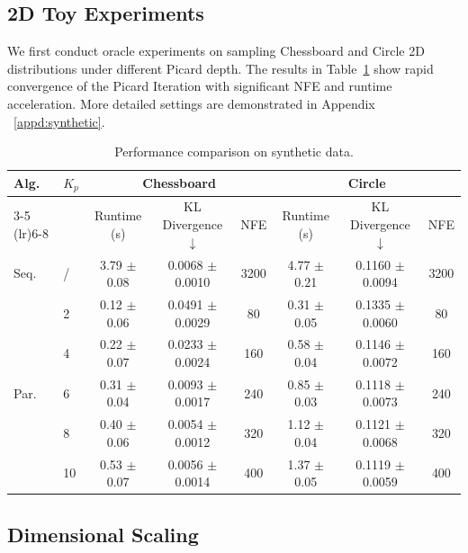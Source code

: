 \documentclass{article}
\begin{document}
\subsection{2D Toy Experiments}
We first conduct oracle experiments on sampling Chessboard and Circle 2D distributions under different Picard depth. The results in Table~\ref{tab:2Dtoy} show rapid convergence of the Picard Iteration with significant NFE and runtime acceleration. More detailed settings are demonstrated in Appendix ~\ref{appd:synthetic}.
\begin{table}[ht]
\centering
\captionsetup{skip=8pt}
\small
\caption{Performance comparison on synthetic data.}
\label{tab:2Dtoy}
\begin{tabular}{ll ccc ccc}
\toprule
\multirow{2}{*}{Alg.} & \multirow{2}{*}{$K_p$} & \multicolumn{3}{c}{\textbf{Chessboard}} & \multicolumn{3}{c}{\textbf{Circle}} \\
\cmidrule(lr){3-5} \cmidrule(lr){6-8}
& & Runtime (s) & KL Divergence$\downarrow$ & NFE & Runtime (s) & KL Divergence$\downarrow$ & NFE \\
\midrule
Seq. 
& / & 3.79 $\pm$ 0.08 & 0.0068 $\pm$ 0.0010 & 3200 & 4.77 $\pm$ 0.21 & 0.1160 $\pm$ 0.0094 & 3200 \\
\midrule
\multirow{6}{*}{Par.} 
& 2  & 0.12 $\pm$ 0.06 & 0.0491 $\pm$ 0.0029 & 80  & 0.31 $\pm$ 0.05 & 0.1335 $\pm$ 0.0060 & 80  \\
& 4  & 0.22 $\pm$ 0.07 & 0.0233 $\pm$ 0.0024 & 160  & 0.58 $\pm$ 0.04 & 0.1146 $\pm$ 0.0072 & 160  \\
& 6  & 0.31 $\pm$ 0.04 & 0.0093 $\pm$ 0.0017 & 240  & 0.85 $\pm$ 0.03 & 0.1118 $\pm$ 0.0073 & 240  \\
& 8  & 0.40 $\pm$ 0.06 & 0.0054 $\pm$ 0.0012 & 320  & 1.12 $\pm$ 0.04 & 0.1121 $\pm$ 0.0068 & 320  \\
& 10 & 0.53 $\pm$ 0.07 & 0.0056 $\pm$ 0.0014 & 400  & 1.37 $\pm$ 0.05 & 0.1119 $\pm$ 0.0059 & 400 \\
\bottomrule
\end{tabular} 
\end{table}

\subsection{Dimensional Scaling}
\end{document}
